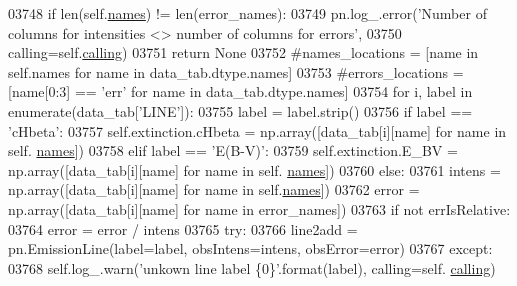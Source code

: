 \begin{DoxyCode}
{{{{{{{{{{{{{{{{{{{{{{03748             \textcolor{keywordflow}{if} len(self.\hyperlink{classpyneb_1_1core_1_1pynebcore_1_1_observation_a3f365d0b1488b2eba300bf71caf23c17}{names}) != len(error\_names):
03749                 pn.log\_.error(\textcolor{stringliteral}{'Number of columns for intensities <> number of columns for errors'},
03750                               calling=self.\hyperlink{classpyneb_1_1core_1_1pynebcore_1_1_observation_a2639fad9af4fefad20e4097295bd40e7}{calling})
03751                 \textcolor{keywordflow}{return} \textcolor{keywordtype}{None}
03752             \textcolor{comment}{#names\_locations = [name in self.names for name in data\_tab.dtype.names]}
03753             \textcolor{comment}{#errors\_locations = [name[0:3] == 'err' for name in data\_tab.dtype.names]}
03754             \textcolor{keywordflow}{for} i, label \textcolor{keywordflow}{in} enumerate(data\_tab[\textcolor{stringliteral}{'LINE'}]):
03755                 label = label.strip()
03756                 \textcolor{keywordflow}{if} label == \textcolor{stringliteral}{'cHbeta'}:
03757                     self.extinction.cHbeta = np.array([data\_tab[i][name] \textcolor{keywordflow}{for} name \textcolor{keywordflow}{in} self.
      \hyperlink{classpyneb_1_1core_1_1pynebcore_1_1_observation_a3f365d0b1488b2eba300bf71caf23c17}{names}])
03758                 \textcolor{keywordflow}{elif} label == \textcolor{stringliteral}{'E(B-V)'}:
03759                     self.extinction.E\_BV = np.array([data\_tab[i][name] \textcolor{keywordflow}{for} name \textcolor{keywordflow}{in} self.
      \hyperlink{classpyneb_1_1core_1_1pynebcore_1_1_observation_a3f365d0b1488b2eba300bf71caf23c17}{names}])
03760                 \textcolor{keywordflow}{else}:
03761                     intens = np.array([data\_tab[i][name] \textcolor{keywordflow}{for} name \textcolor{keywordflow}{in} self.\hyperlink{classpyneb_1_1core_1_1pynebcore_1_1_observation_a3f365d0b1488b2eba300bf71caf23c17}{names}])
03762                     error = np.array([data\_tab[i][name] \textcolor{keywordflow}{for} name \textcolor{keywordflow}{in} error\_names])
03763                     \textcolor{keywordflow}{if} \textcolor{keywordflow}{not} errIsRelative:
03764                         error = error / intens
03765                     \textcolor{keywordflow}{try}:
03766                         line2add = pn.EmissionLine(label=label, obsIntens=intens, obsError=error)
03767                     \textcolor{keywordflow}{except}:
03768                         self.log\_.warn(\textcolor{stringliteral}{'unkown line label \{0\}'}.format(label), calling=self.
      \hyperlink{classpyneb_1_1core_1_1pynebcore_1_1_observation_a2639fad9af4fefad20e4097295bd40e7}{calling})
}}}}}}}}}}}}}}}}}}}}}}
\end{DoxyCode}
